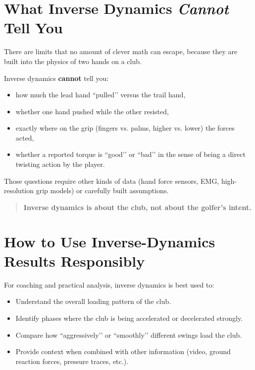 \documentclass[12pt]{article}
\begin{document}
\section{What Inverse Dynamics \emph{Cannot} Tell You}

There are limits that no amount of clever math can escape, because they are built into the physics of two hands on a club.

Inverse dynamics \textbf{cannot} tell you:
\begin{itemize}
    \item how much the lead hand ``pulled’’ versus the trail hand,
    \item whether one hand pushed while the other resisted,
    \item exactly where on the grip (fingers vs. palms, higher vs. lower) the forces acted,
    \item whether a reported torque is ``good’’ or ``bad’’ in the sense of being a direct twisting action by the player.
\end{itemize}

Those questions require other kinds of data (hand force sensors, EMG, high-resolution grip models) or carefully built assumptions.

\begin{quote}
\textbf{Inverse dynamics is about the club, not about the golfer’s intent.}
\end{quote}

\section{How to Use Inverse-Dynamics Results Responsibly}

For coaching and practical analysis, inverse dynamics is best used to:
\begin{itemize}
    \item Understand the overall loading pattern of the club.
    \item Identify phases where the club is being accelerated or decelerated strongly.
    \item Compare how ``aggressively’’ or ``smoothly’’ different swings load the club.
    \item Provide context when combined with other information (video, ground reaction forces, pressure traces, etc.).
\end{itemize}
\end{document}
